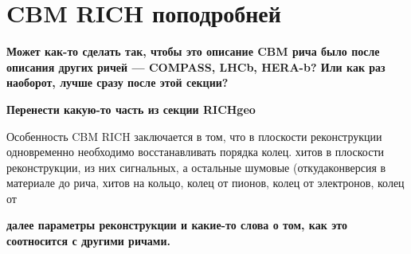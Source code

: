 
% 



\section{CBM RICH поподробней}

\todo \textbf{Может как-то сделать так, чтобы это описание CBM рича было после описания других ричей --- COMPASS, LHCb, HERA-b? Или как раз наоборот, лучше сразу после этой секции?}

\todo \textbf{Перенести какую-то часть из секции RICHgeo}

Особенность CBM RICH заключается в том, что в плоскости реконструкции одновременно необходимо восстанавливать порядка \todo колец. 
\todo хитов в плоскости реконструкции, из них \todo сигнальных, а остальные шумовые (откуда\todo  конверсия в материале до рича\todo , \todo хитов на кольцо, \todo колец от пионов, \todo колец от электронов, \todo колец от \todo

\todo \textbf{далее параметры реконструкции и какие-то слова о том, как это соотносится с другими ричами.}




